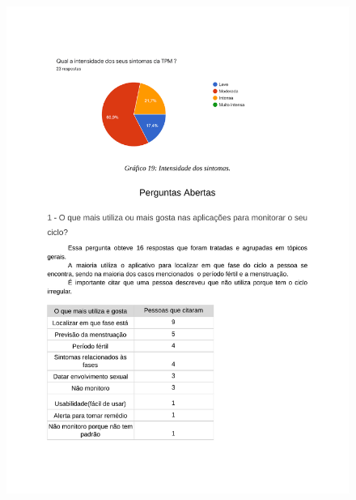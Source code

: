 \begin{apendicesenv}
        \begin{figure}[ht]
            \centering
            \includegraphics[keepaspectratio=true,scale=0.7]{figuras/Tab15.pdf}
        \end{figure}
        

\end{apendicesenv}
